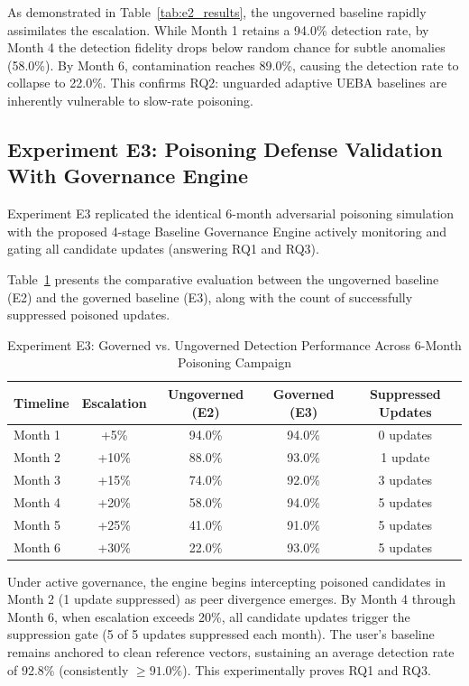 \documentclass[conference]{IEEEtran}
\begin{document}
As demonstrated in Table~\ref{tab:e2_results}, the ungoverned baseline rapidly assimilates the escalation. While Month 1 retains a 94.0\% detection rate, by Month 4 the detection fidelity drops below random chance for subtle anomalies (58.0\%). By Month 6, contamination reaches 89.0\%, causing the detection rate to collapse to 22.0\%. This confirms RQ2: unguarded adaptive UEBA baselines are inherently vulnerable to slow-rate poisoning.

\subsection{Experiment E3: Poisoning Defense Validation With Governance Engine}
\label{subsec:e3}
Experiment E3 replicated the identical 6-month adversarial poisoning simulation with the proposed 4-stage Baseline Governance Engine actively monitoring and gating all candidate updates (answering RQ1 and RQ3).

Table~\ref{tab:e3_results} presents the comparative evaluation between the ungoverned baseline (E2) and the governed baseline (E3), along with the count of successfully suppressed poisoned updates.

\begin{table}[htbp]
\caption{Experiment E3: Governed vs. Ungoverned Detection Performance Across 6-Month Poisoning Campaign}
\label{tab:e3_results}
\centering
\begin{tabular}{lcccc}
\toprule
\textbf{Timeline} & \textbf{Escalation} & \textbf{Ungoverned (E2)} & \textbf{Governed (E3)} & \textbf{Suppressed Updates} \\
\midrule
Month 1 & +5\%  & 94.0\% & 94.0\% & 0 updates \\
Month 2 & +10\% & 88.0\% & 93.0\% & 1 update  \\
Month 3 & +15\% & 74.0\% & 92.0\% & 3 updates \\
Month 4 & +20\% & 58.0\% & 94.0\% & 5 updates \\
Month 5 & +25\% & 41.0\% & 91.0\% & 5 updates \\
Month 6 & +30\% & 22.0\% & 93.0\% & 5 updates \\
\bottomrule
\end{tabular}
\end{table}

Under active governance, the engine begins intercepting poisoned candidates in Month 2 (1 update suppressed) as peer divergence emerges. By Month 4 through Month 6, when escalation exceeds 20\%, all candidate updates trigger the suppression gate (5 of 5 updates suppressed each month). The user's baseline remains anchored to clean reference vectors, sustaining an average detection rate of 92.8\% (consistently $\ge 91.0\%$). This experimentally proves RQ1 and RQ3.
\end{document}
